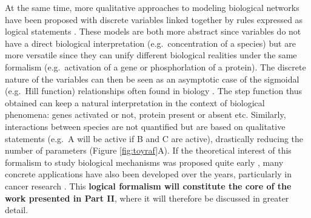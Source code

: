 \documentclass[a4paper,12pt,twoside,onecolumn,openright,final,oldfontcommands]{memoir}
\begin{document}
At the same time, more qualitative approaches to modeling biological
networks have been proposed with discrete variables linked together by
rules expressed as logical statements \citep{abou2016logical}. These
models are both more abstract since variables do not have a direct
biological interpretation (e.g.~concentration of a species) but are more
versatile since they can unify different biological realities under the
same formalism (e.g.~activation of a gene or phosphorlation of a
protein). The discrete nature of the variables can then be seen as an
asymptotic case of the sigmoidal (e.g.~Hill function) relationships
often found in biology \citep{le2015quantitative}. The step function
thus obtained can keep a natural interpretation in the context of
biological phenomena: genes activated or not, protein present or absent
etc. Similarly, interactions between species are not quantified but are
based on qualitative statements (e.g.~A will be active if B and C are
active), drastically reducing the number of parameters (Figure
\ref{fig:toyraf}A). If the theoretical interest of this formalism to
study biological mechanisms was proposed quite early
\citep{kauffman1969homeostasis, thomas1973boolean}, many concrete
applications have also been developed over the years, particularly in
cancer research \citep{saez2011comparing, remy2015modeling}. This
\textbf{logical formalism will constitute the core of the work presented
in Part II}, where it will therefore be discussed in greater detail.
\end{document}
